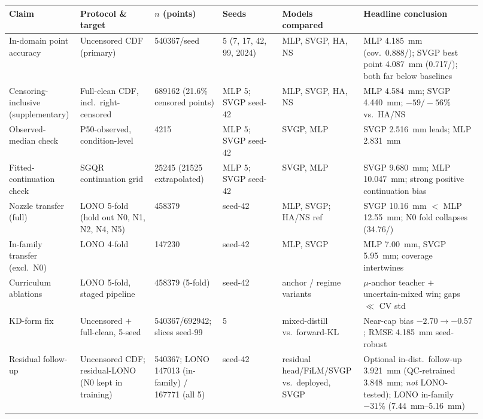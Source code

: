 \begin{table}[!ht]
\centering
\scriptsize
\setlength{\tabcolsep}{3pt}
\renewcommand{\arraystretch}{1.2}
\begin{tabular}{@{}L{0.12\linewidth}L{0.15\linewidth}L{0.13\linewidth}L{0.12\linewidth}L{0.16\linewidth}L{0.24\linewidth}@{}}
\toprule
Claim & Protocol \& target & $n$ (points) & Seeds & Models compared & Headline conclusion \\
\midrule
In-domain point accuracy & Uncensored CDF (primary) & \num{540367}/seed & 5 (7, 17, 42, 99, 2024) & MLP, SVGP, HA, NS & MLP \SI{4.185}{mm} (cov.\ 0.888/); SVGP best point \SI{4.087}{mm} (0.717/); both far below baselines \\
\addlinespace
Censoring-inclusive (supplementary) & Full-clean CDF, incl.\ right-censored & \num{689162} (21.6\% censored points) & MLP 5; SVGP seed-42 & MLP, SVGP, HA, NS & MLP \SI{4.584}{mm}; SVGP \SI{4.440}{mm}; $-59/-56\%$ vs.\ HA/\allowbreak NS \\
\addlinespace
Observed-median check & P50-observed, condition-level & \num{4215} & MLP 5; SVGP seed-42 & SVGP, MLP & SVGP \SI{2.516}{mm} leads; MLP \SI{2.831}{mm} \\
\addlinespace
Fitted-continuation check & SGQR continuation grid & \num{25245} (\num{21525} extrapolated) & MLP 5; SVGP seed-42 & SVGP, MLP & SVGP \SI{9.680}{mm}; MLP \SI{10.047}{mm}; strong positive continuation bias \\
\addlinespace
Nozzle transfer (full) & LONO 5-fold (hold out N0, N1, N2, N4, N5) & \num{458379} & seed-42 & MLP, SVGP; HA/\allowbreak NS ref & SVGP \SI{10.16}{mm} $<$ MLP \SI{12.55}{mm}; N0 fold collapses (34.76/) \\
\addlinespace
In-family transfer (excl.\ N0) & LONO 4-fold & \num{147230} & seed-42 & MLP, SVGP & MLP \SI{7.00}{mm}, SVGP \SI{5.95}{mm}; coverage intertwines \\
\addlinespace
Curriculum ablations & LONO 5-fold, staged pipeline & \num{458379} (5-fold) & seed-42 & anchor / regime variants & $\mu$-anchor teacher $+$ uncertain-mixed win; gaps $\ll$ CV std \\
\addlinespace
KD-form fix & Uncensored $+$ full-clean, 5-seed & \num{540367}/\allowbreak\num{692942}; slices seed-99 & 5 & mixed-distill vs.\ forward-KL & Near-cap bias $-2.70\to-0.57$; RMSE \SI{4.185}{mm} seed-robust \\
\addlinespace
Residual follow-up & Uncensored CDF; residual-LONO (N0 kept in training) & \num{540367}; LONO \num{147013} (in-family) / \num{167771} (all 5) & seed-42 & residual head/\allowbreak FiLM/\allowbreak SVGP vs.\ deployed, SVGP & Optional in-dist.\ follow-up \SI{3.921}{mm} (QC-retrained \SI{3.848}{mm}; \emph{not} LONO-tested); LONO in-family $-31\%$ (\SIrange{7.44}{5.16}{mm}) \\

\end{tabular}
\end{table}

